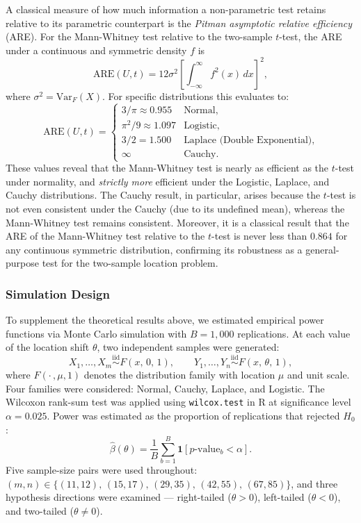 \documentclass[10pt]{article}
\begin{document}
A classical measure of how much information a non-parametric test retains
relative to its parametric counterpart is the \textit{Pitman asymptotic
relative efficiency} (ARE). For the Mann-Whitney test relative to the
two-sample $t$-test, the ARE under a continuous and symmetric density $f$ is
\[
    \mathrm{ARE}(U, t) = 12\sigma^2 \left[\int_{-\infty}^{\infty} f^2(x)\,dx\right]^2,
\]
where $\sigma^2 = \mathrm{Var}_{F}(X)$. For specific distributions this
evaluates to:
\[
    \mathrm{ARE}(U,t) = \begin{cases}
        3/\pi \approx 0.955 & \text{Normal},\\[4pt]
        \pi^2/9 \approx 1.097 & \text{Logistic},\\[4pt]
        3/2 = 1.500 & \text{Laplace (Double Exponential)},\\[4pt]
        \infty & \text{Cauchy}.
    \end{cases}
\]
These values reveal that the Mann-Whitney test is nearly as efficient as the
$t$-test under normality, and \textit{strictly more} efficient under the
Logistic, Laplace, and Cauchy distributions. The Cauchy result, in particular,
arises because the $t$-test is not even consistent under the Cauchy (due to its
undefined mean), whereas the Mann-Whitney test remains consistent. Moreover, it
is a classical result that the ARE of the
Mann-Whitney test relative to the $t$-test is never less than $0.864$ for any
continuous symmetric distribution, confirming its robustness as a general-purpose
test for the two-sample location problem.
 
\subsubsection{Simulation Design}
 
To supplement the theoretical results above, we estimated empirical power
functions via Monte Carlo simulation with $B = 1{,}000$ replications. At each
value of the location shift $\theta$, two independent samples were generated:
\[
    X_1, \ldots, X_m \overset{\text{iid}}{\sim} F(x,\,0,\,1), \qquad
    Y_1, \ldots, Y_n \overset{\text{iid}}{\sim} F(x,\,\theta,\,1),
\]
where $F(\cdot\,,\mu,1)$ denotes the distribution family with location $\mu$ and
unit scale. Four families were considered: Normal, Cauchy, Laplace, and
Logistic. The Wilcoxon rank-sum test was applied using \texttt{wilcox.test} in
\textsf{R} at significance level $\alpha = 0.025$. Power was estimated as the
proportion of replications that rejected $H_0$:
\[
    \hat{\beta}(\theta) = \frac{1}{B}\sum_{b=1}^{B}
    \mathbf{1}\!\left[p\text{-value}_b < \alpha\right].
\]
Five sample-size pairs were used throughout: $(m,n) \in \{(11,12),\,
(15,17),\,(29,35),\,(42,55),\,(67,85)\}$, and three hypothesis directions were
examined --- right-tailed ($\theta > 0$), left-tailed ($\theta < 0$), and
two-tailed ($\theta \neq 0$).
 
\end{document}
